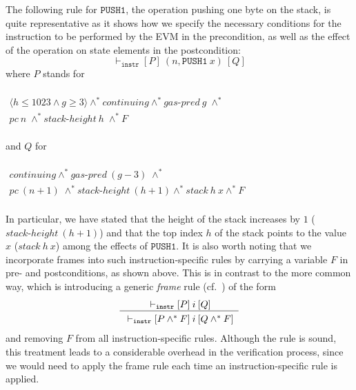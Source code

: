 \documentclass[sigplan,10pt]{acmart}\settopmatter{printfolios=true,printccs=false,printacmref=false}
\newcommand{\sconj}{\wedge^*}
\newcommand{\ttrip}[5]{\mathit{#1} \vdash_{\mathrm{#2}}[#3]\:#4\:[#5]}
\newcommand{\cont}{\mathit{continuing}}
\newcommand{\pc}{\mathit{pc}}
\newcommand{\gaspred}{\mathit{gas\mbox{-}pred}}
\newcommand{\stackh}{\mathit{stack\mbox{-}height}}
\newcommand{\stack}{\mathit{stack}}
\newcommand{\instr}[1]{\mathtt{#1}}
\newcommand{\pure}[1]{\langle#1\rangle}
\newcommand{\RuleC}[2]{\begin{array}{c}#1\\\hline\noalign{\smallskip}#2\end{array}}
\begin{document}
%
%
%
The following rule for $\instr{PUSH1}$, the operation pushing one byte on the stack, is quite representative
as it shows how we specify the necessary conditions for 
the instruction to be performed by the EVM in the precondition, as well as
the effect of the operation on state elements in the postcondition:
\[
\ttrip{}{\mathtt{instr}}{P}{(n, \instr{PUSH1}\:x)}{Q}
\]
where $P$ stands for 
\\
\\$
\begin{array}{l}
\pure{h \le 1023 \wedge g \geq 3} \sconj \cont \sconj \gaspred\:g \; \sconj \\
\pc\:n \; \sconj \stackh\:h \; \sconj F 
\end{array}
$\\ 
\\
and $Q$ for\\
\\$
\begin{array}{l}
\cont \sconj \gaspred\:(g - 3) \; \sconj \\
\pc\:(n+1) \; \sconj \stackh\:(h + 1) \sconj \stack\:h\:x \sconj F
\end{array}
$\\
\\
In particular, we have stated that the height of the stack increases by $1$ 
($\stackh\:(h + 1)$)
and that the top index $h$ of the stack points to the value $x$ ($\stack\:h\:x$)
among the effects of $\instr{PUSH1}$. It is also worth noting that we incorporate frames
into such instruction-specific rules by carrying a variable $F$ in pre- and
postconditions, as shown above. This is in contrast to the more common way, which is
introducing a generic \emph{frame} rule (cf.~\cite{Reynolds_02}) of the form
\[
\RuleC{\ttrip{}{\mathtt{instr}}{P}{i}{Q}}{\ttrip{}{\mathtt{instr}}{P \sconj F}{i}{Q \sconj F}}
\] 
and removing $F$ from all instruction-specific rules. Although the rule is sound, this treatment leads to 
a considerable overhead in the verification process, since we would need to apply
the frame rule each time an instruction-specific rule is applied. 
\end{document}
